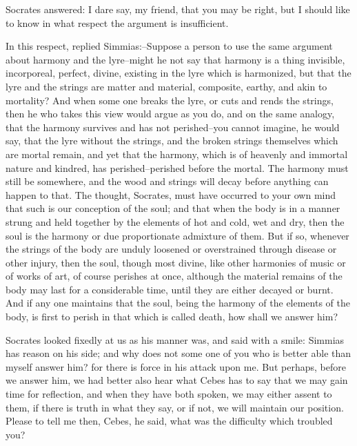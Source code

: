Socrates answered: I dare say, my friend, that you may be right, but I
should like to know in what respect the argument is insufficient.

In this respect, replied Simmias:--Suppose a person to use the same
argument about harmony and the lyre--might he not say that harmony is
a thing invisible, incorporeal, perfect, divine, existing in the lyre
which is harmonized, but that the lyre and the strings are matter and
material, composite, earthy, and akin to mortality? And when some one
breaks the lyre, or cuts and rends the strings, then he who takes this
view would argue as you do, and on the same analogy, that the harmony
survives and has not perished--you cannot imagine, he would say, that
the lyre without the strings, and the broken strings themselves which
are mortal remain, and yet that the harmony, which is of heavenly and
immortal nature and kindred, has perished--perished before the mortal.
The harmony must still be somewhere, and the wood and strings will decay
before anything can happen to that. The thought, Socrates, must have
occurred to your own mind that such is our conception of the soul;
and that when the body is in a manner strung and held together by the
elements of hot and cold, wet and dry, then the soul is the harmony or
due proportionate admixture of them. But if so, whenever the strings of
the body are unduly loosened or overstrained through disease or other
injury, then the soul, though most divine, like other harmonies of music
or of works of art, of course perishes at once, although the material
remains of the body may last for a considerable time, until they are
either decayed or burnt. And if any one maintains that the soul, being
the harmony of the elements of the body, is first to perish in that
which is called death, how shall we answer him?

Socrates looked fixedly at us as his manner was, and said with a smile:
Simmias has reason on his side; and why does not some one of you who
is better able than myself answer him? for there is force in his attack
upon me. But perhaps, before we answer him, we had better also hear what
Cebes has to say that we may gain time for reflection, and when they
have both spoken, we may either assent to them, if there is truth in
what they say, or if not, we will maintain our position. Please to tell
me then, Cebes, he said, what was the difficulty which troubled you?

